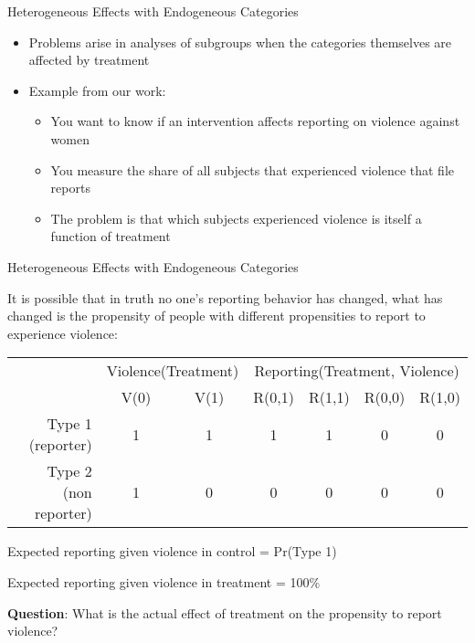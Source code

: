 \documentclass[11pt,ignorenonframetext,]{beamer}
\begin{document}
\begin{frame}{Heterogeneous Effects with Endogeneous Categories}

\begin{itemize} 
\item Problems arise in analyses of subgroups when the categories themselves are affected by treatment
\item Example from our work:
    \begin{itemize}
        \item You want to know if an intervention affects reporting on violence against women
        \item You measure the share of all subjects that experienced violence that file reports
        \item The problem is that which subjects experienced violence is itself a function of treatment
    \end{itemize}
\end{itemize}

\end{frame}

\begin{frame}{Heterogeneous Effects with Endogeneous Categories}

It is possible that in truth no one's reporting behavior has changed,
what has changed is the propensity of people with different propensities
to report to experience violence:

\begin{table} \scriptsize
        \centering
        \begin{tabular}{rcc|cc|cc}
            
            & \multicolumn{ 2}{c}{Violence(Treatment)} & \multicolumn{ 4}{c}{Reporting(Treatment, Violence)} \\
            
            &       V(0) &       V(1) &     R(0,1) &     R(1,1) &     R(0,0) &     R(1,0) \\ \hline
            
            Type 1 (reporter) &          1 &          1 &          1 &          1 &          0 &          0 \\
            
            Type 2 (non reporter) &          1 &          0 &          0 &          0 &          0 &          0 \\          
        \end{tabular}  
    \end{table}

Expected reporting given violence in control = Pr(Type 1)

Expected reporting given violence in treatment = 100\%

\color{red} \textbf{Question}: What is the actual effect of treatment on
the propensity to report violence?

\end{frame}
\end{document}
